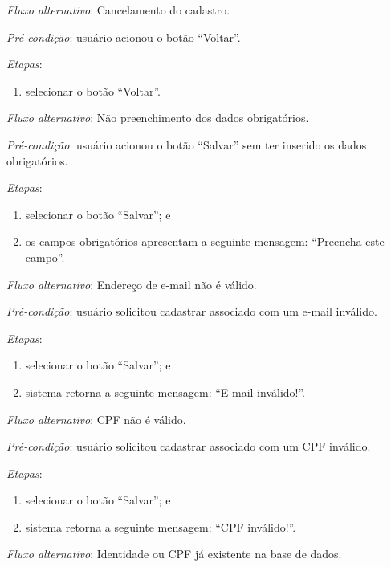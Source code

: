 \noindent \textit{Fluxo alternativo}: Cancelamento do cadastro.

\noindent \textit{Pré-condição}: usuário acionou o botão ``Voltar''.

\noindent \textit{Etapas}:

\begin{enumerate}
    \item selecionar o botão ``Voltar''.
\end{enumerate}

\noindent \textit{Fluxo alternativo}: Não preenchimento dos dados obrigatórios.

\noindent \textit{Pré-condição}: usuário acionou o botão ``Salvar'' sem ter inserido os dados obrigatórios.

\noindent \textit{Etapas}:

\begin{enumerate}
    \item selecionar o botão ``Salvar''; e
    \item os campos obrigatórios apresentam a seguinte mensagem: ``Preencha este campo''.
\end{enumerate}


\noindent \textit{Fluxo alternativo}: Endereço de e-mail não é válido.

\noindent \textit{Pré-condição}: usuário solicitou cadastrar associado com um e-mail inválido.

\noindent \textit{Etapas}:

\begin{enumerate}
    \item selecionar o botão ``Salvar''; e
    \item sistema retorna a seguinte mensagem: ``E-mail inválido!''.
\end{enumerate}


\noindent \textit{Fluxo alternativo}: CPF não é válido.

\noindent \textit{Pré-condição}: usuário solicitou cadastrar associado com um CPF inválido.

\noindent \textit{Etapas}:

\begin{enumerate}
    \item selecionar o botão ``Salvar''; e
    \item sistema retorna a seguinte mensagem: ``CPF inválido!''.
\end{enumerate}


\noindent \textit{Fluxo alternativo}: Identidade ou CPF já existente na base de dados.

